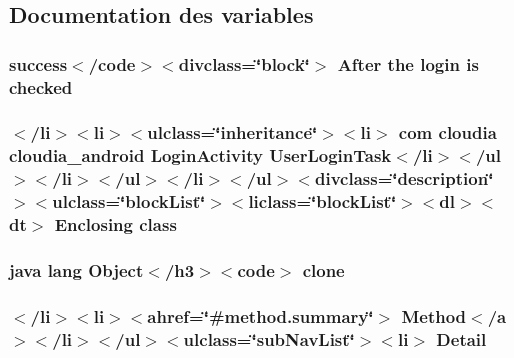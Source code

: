 \subsection{Documentation des variables}
\hypertarget{_login_activity_8_user_login_task_8html_a5fdeb16ca19e138087f9c484ca68188d}{
\subsubsection[{checked}]{\setlength{\rightskip}{0pt plus 5cm}success$<$/code$>$$<$divclass=\char`\"{}block\char`\"{}$>$ After the login is checked}}\label{_login_activity_8_user_login_task_8html_a5fdeb16ca19e138087f9c484ca68188d}
\hypertarget{_login_activity_8_user_login_task_8html_ae3196d8bd07705701339d5a4ca6799a8}{
\subsubsection[{class}]{\setlength{\rightskip}{0pt plus 5cm}$<$/li$>$$<$li$>$$<$ulclass=\char`\"{}inheritance\char`\"{}$>$$<$li$>$ com cloudia cloudia\-\_\-android {\bf Login\-Activity} User\-Login\-Task$<$/li$>$$<$/ul$>$$<$/li$>$$<$/ul$>$$<$/li$>$$<$/ul$>$$<$divclass=\char`\"{}description\char`\"{}$>$$<$ulclass=\char`\"{}block\-List\char`\"{}$>$$<$liclass=\char`\"{}block\-List\char`\"{}$>$$<$dl$>$$<${\bf dt}$>$ Enclosing class}}\label{_login_activity_8_user_login_task_8html_ae3196d8bd07705701339d5a4ca6799a8}
\hypertarget{_login_activity_8_user_login_task_8html_adc9607fcabf6f2d7f401ad52015ef6e0}{
\subsubsection[{clone}]{\setlength{\rightskip}{0pt plus 5cm}java lang Object$<$/h3$>$$<$code$>$ clone}}\label{_login_activity_8_user_login_task_8html_adc9607fcabf6f2d7f401ad52015ef6e0}
\hypertarget{_login_activity_8_user_login_task_8html_a1e04b5ec07bcd5281e26dcd40e5b3a94}{
\subsubsection[{Detail}]{\setlength{\rightskip}{0pt plus 5cm}$<$/li$>$$<$li$>$$<$ahref=\char`\"{}\#method.\-summary\char`\"{}$>$ Method$<$/{\bf a}$>$$<$/li$>$$<$/ul$>$$<$ulclass=\char`\"{}sub\-Nav\-List\char`\"{}$>$$<$li$>$ Detail}}\label{_login_activity_8_user_login_task_8html_a1e04b5ec07bcd5281e26dcd40e5b3a94}

